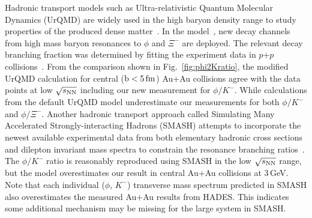 \documentclass[%
 reprint,	
showpacs,
 amsmath,amssymb,
 aps,
 prc,
]{revtex4-1}
\begin{document}
    

Hadronic transport models such as Ultra-relativistic Quantum Molecular Dynamics (UrQMD) are widely used in the high baryon density range to study properties of the produced dense matter~\cite{urQMD,UrQMD_2}. In the model~\cite{Steinheimer_2015_UrQMD}, new decay channels from high mass baryon resonances to $\phi$ and $\Xi^-$ are deployed. The relevant decay branching fraction was determined by fitting the experiment data in $p$+$p$ collisions~\cite{ANKE_phi}. From the comparison shown in Fig.~\ref{fig:phi2Kratio}, the modified UrQMD calculation for central ($\rm{b}<5\,\rm{fm}$) Au+Au collisions agree with the data points at low ${\sqrt{s_{\rm NN}}}$ including our new measurement for $\phi/K^-$.
While calculations from the default UrQMD model underestimate our measurements for both $\phi/K^-$ and $\phi/\Xi^-$.   
Another hadronic transport approach called Simulating Many Accelerated Strongly-interacting Hadrons (SMASH) attempts to incorporate the newest available experimental data from both elementary hadronic cross sections and dilepton invariant mass spectra to constrain the resonance branching ratios~\cite{Elfner_SMASH}. The $\phi/K^-$ ratio is reasonably reproduced using SMASH in the low ${\sqrt{s_{\rm NN}}}$ range, but the model overestimates our result in central Au+Au collisions at 3\,GeV. Note that each individual ($\phi$, $K^-$) transverse mass spectrum predicted in SMASH also overestimates the measured Au+Au results from HADES.
This indicates some additional mechanism may be missing for the large system in SMASH.
\end{document}
